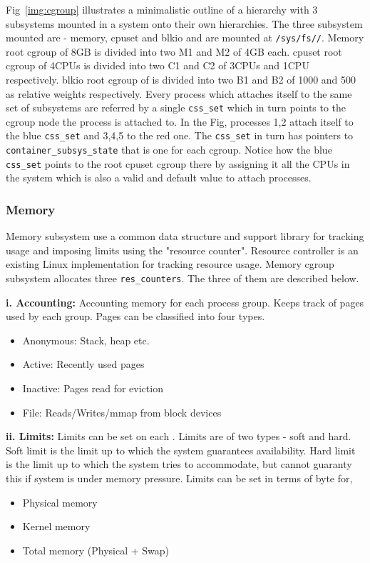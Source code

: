       Fig~\ref{img:cgroup} illustrates a minimalistic outline of a \cg{} hierarchy with 3 subsystems mounted in a system onto their own 
  hierarchies. The three subsystem mounted are - memory, cpuset and blkio and are mounted at \texttt{/sys/fs/\cg{}/}. Memory root cgroup 
of   8GB is divided into two \cg{} M1 and M2 of 4GB each. cpuset root cgroup of 4CPUs is divided into two \cg{} C1 and C2 of 3CPUs and 
1CPU respectively. blkio root cgroup of is divided into two \cg{} B1 and B2 of 1000 and 500 as relative weights respectively. Every 
process   which attaches itself to the same set of subsystems are referred by a single \texttt{css\_set} which in turn points to the 
cgroup node the   process is attached to. In the Fig, processes 1,2 attach itself to the blue \texttt{css\_set} and 3,4,5 to the red one. 
The \texttt{css\_set} in turn has pointers to \texttt{container\_subsys\_state} that is one for each cgroup. Notice how the blue 
\texttt{css\_set} points to the   root cpuset cgroup there by assigning it all the CPUs in the system which is also a valid and 
default value to attach processes.
      
      \subsubsection{Memory \cg{}}
	
	Memory subsystem use a common data structure and support library for tracking usage and imposing limits using the "resource 
counter". Resource controller is an existing Linux implementation for tracking resource usage. Memory cgroup subsystem allocates three 
\texttt{res\_counters}. The three of them are described below.

      \textbf{i. Accounting:} Accounting memory for each process group. Keeps track of pages used by each group. Pages can be classified 
into four types. 
      \begin{itemize}
	\item Anonymous: Stack, heap etc.
	\item Active: Recently used pages
	\item Inactive: Pages read for eviction
	\item File: Reads/Writes/mmap from block devices
      \end{itemize}
	
      \textbf{ii. Limits:} Limits can be set on each \cg{}. Limits are of two types - soft and hard. Soft limit is the limit up to which 
the system guarantees availability. Hard limit is the limit up to which the system tries to accommodate, but cannot guaranty this if 
system is under memory pressure. Limits can be set in terms of byte for,
      \begin{itemize}
	\item Physical memory
	\item Kernel memory
	\item Total memory (Physical + Swap)
      \end{itemize}

